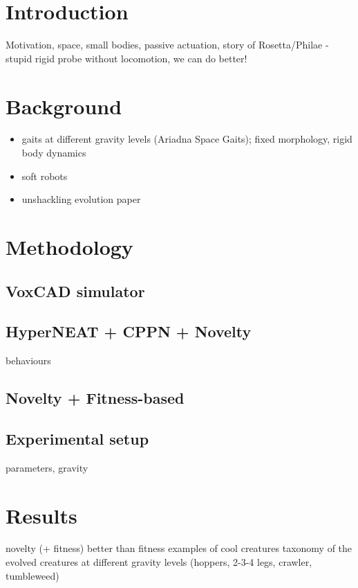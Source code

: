 \documentclass{sig-alternate}
\begin{document}



\section{Introduction}
Motivation, space, small bodies, passive actuation, story of Rosetta/Philae - stupid rigid probe without locomotion, we can do better!

\section{Background}
\begin{itemize}
\item gaits at different gravity levels (Ariadna Space Gaits); fixed morphology, rigid body dynamics
\item soft robots
\item unshackling evolution paper
\end{itemize}

\section{Methodology}
\subsection{VoxCAD simulator}

\subsection{HyperNEAT + CPPN + Novelty}
behaviours

\subsection{Novelty + Fitness-based}

\subsection{Experimental setup}
parameters, gravity

\section{Results}
novelty (+ fitness) better than fitness
examples of cool creatures
taxonomy of the evolved creatures at different gravity levels (hoppers, 2-3-4 legs, crawler, tumbleweed) 
\end{document}
